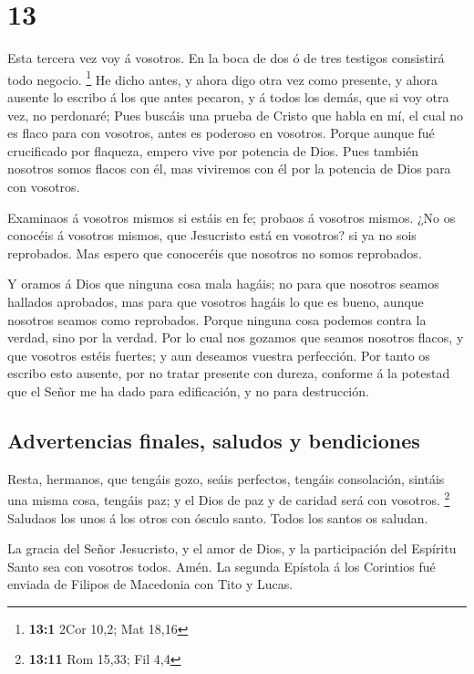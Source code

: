\hypertarget{section-12}{%
\section{13}\label{section-12}}

 Esta tercera vez voy á vosotros. En la boca de dos ó de
tres testigos consistirá todo negocio. \footnote{\textbf{13:1} 2Cor
  10,2; Mat 18,16}  He dicho antes, y ahora digo otra vez
como presente, y ahora ausente lo escribo á los que antes pecaron, y á
todos los demás, que si voy otra vez, no perdonaré;  Pues
buscáis una prueba de Cristo que habla en mí, el cual no es flaco para
con vosotros, antes es poderoso en vosotros.  Porque
aunque fué crucificado por flaqueza, empero vive por potencia de Dios.
Pues también nosotros somos flacos con él, mas viviremos con él por la
potencia de Dios para con vosotros.

 Examinaos á vosotros mismos si estáis en fe; probaos á
vosotros mismos. ¿No os conocéis á vosotros mismos, que Jesucristo está
en vosotros? si ya no sois reprobados.  Mas espero que
conoceréis que nosotros no somos reprobados.

 Y oramos á Dios que ninguna cosa mala hagáis; no para que
nosotros seamos hallados aprobados, mas para que vosotros hagáis lo que
es bueno, aunque nosotros seamos como reprobados.  Porque
ninguna cosa podemos contra la verdad, sino por la verdad.
 Por lo cual nos gozamos que seamos nosotros flacos, y que
vosotros estéis fuertes; y aun deseamos vuestra perfección.
 Por tanto os escribo esto ausente, por no tratar
presente con dureza, conforme á la potestad que el Señor me ha dado para
edificación, y no para destrucción.

\hypertarget{advertencias-finales-saludos-y-bendiciones}{%
\subsection{Advertencias finales, saludos y
bendiciones}\label{advertencias-finales-saludos-y-bendiciones}}

 Resta, hermanos, que tengáis gozo, seáis perfectos,
tengáis consolación, sintáis una misma cosa, tengáis paz; y el Dios de
paz y de caridad será con vosotros. \footnote{\textbf{13:11} Rom 15,33;
  Fil 4,4}  Saludaos los unos á los otros con ósculo
santo. Todos los santos os saludan.

 La gracia del Señor Jesucristo, y el amor de Dios, y la
participación del Espíritu Santo sea con vosotros todos. Amén. La
segunda Epístola á los Corintios fué enviada de Filipos de Macedonia con
Tito y Lucas. 
